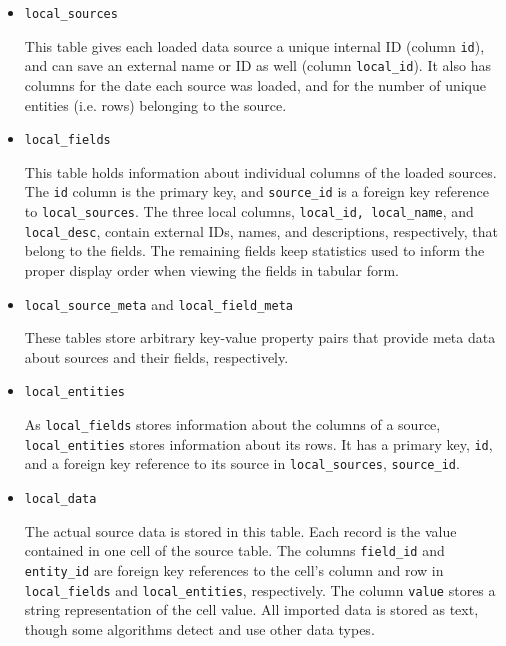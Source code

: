 \begin{itemize}

\item \texttt{local\_sources}

This table gives each loaded data source a unique internal ID (column \texttt{id}), and can save an external name or ID as well (column \texttt{local\_id}).  It also has columns for the date each source was loaded, and for the number of unique entities (i.e. rows) belonging to the source.

\item \texttt{local\_fields}

This table holds information about individual columns of the loaded sources.  The \texttt{id} column is the primary key, and \texttt{source\_id} is a foreign key reference to \texttt{local\_sources}.  The three local columns, \texttt{local\_id, local\_name}, and \texttt{local\_desc}, contain external IDs, names, and descriptions, respectively, that belong to the fields.  The remaining fields keep statistics used to inform the proper display order when viewing the fields in tabular form.

\item \texttt{local\_source\_meta} and \texttt{local\_field\_meta}

These tables store arbitrary key-value property pairs that provide meta data about sources and their fields, respectively.

\item \texttt{local\_entities}

As \texttt{local\_fields} stores information about the columns of a source, \texttt{local\_entities} stores information about its rows.  It has a primary key, \texttt{id}, and a foreign key reference to its source in \texttt{local\_sources}, \texttt{source\_id}.

\item \texttt{local\_data}

The actual source data is stored in this table.  Each record is the value contained in one cell of the source table.  The columns \texttt{field\_id} and \texttt{entity\_id} are foreign key references to the cell's column and row in \texttt{local\_fields} and \texttt{local\_entities}, respectively.  The column \texttt{value} stores a string representation of the cell value.  All imported data is stored as text, though some algorithms detect and use other data types.

\end{itemize}


